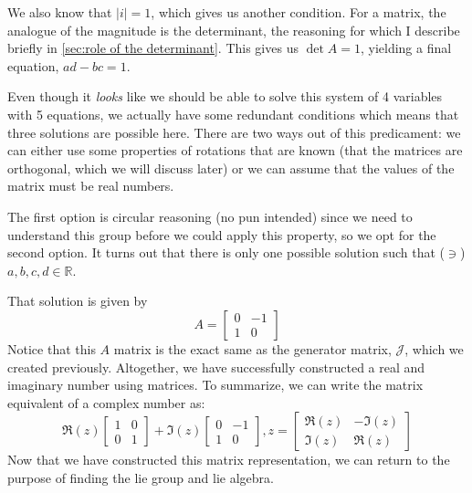 We also know that $|i|=1$, which gives us another condition. For a matrix, the analogue of the magnitude is the determinant, the reasoning for which I describe briefly in \autoref{sec:role of the determinant}. This gives us $\det A=1$, yielding a final equation, $ad-bc=1$.

Even though it \textit{looks} like we should be able to solve this system of 4 variables with 5 equations, we actually have some redundant conditions which means that three solutions are possible here. There are two ways out of this predicament: we can either use some properties of rotations that are known (that the matrices are orthogonal, which we will discuss later) or we can assume that the values of the matrix must be real numbers.

The first option is circular reasoning (no pun intended) since we need to understand this group before we could apply this property, so we opt for the second option. It turns out that there is only one possible solution such that ($\ni$) $ a,b,c,d\in \mathbb{R}$.

That solution is given by $$A=\begin{bmatrix}
    0&-1\\1&0
\end{bmatrix}$$
Notice that this $A$ matrix is the exact same as the generator matrix, $\mathcal{J}$, which we created previously. Altogether, we have successfully constructed a real and imaginary number using matrices. To summarize, we can write the matrix equivalent of a complex number as:
$$\Re(z)\begin{bmatrix}
    1&0\\0&1
\end{bmatrix}+\Im(z)\begin{bmatrix}
    0&-1\\1&0
\end{bmatrix},z=\begin{bmatrix}
    \Re(z)&-\Im(z)\\\Im(z)&\Re(z)
\end{bmatrix}$$
Now that we have constructed this matrix representation, we can return to the purpose of finding the \gls{lie group} and \gls{lie algebra}.

